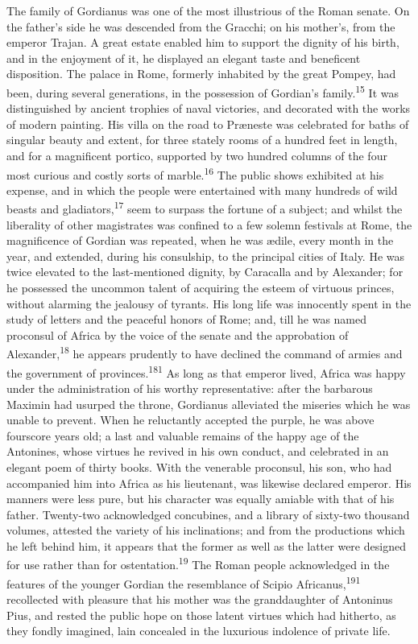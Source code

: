 The family of Gordianus was one of the most illustrious of the
Roman senate. On the father’s side he was descended from the
Gracchi; on his mother’s, from the emperor Trajan. A great estate
enabled him to support the dignity of his birth, and in the
enjoyment of it, he displayed an elegant taste and beneficent
disposition. The palace in Rome, formerly inhabited by the great
Pompey, had been, during several generations, in the possession
of Gordian’s family.\textsuperscript{15} It was distinguished by ancient trophies
of naval victories, and decorated with the works of modern
painting. His villa on the road to Præneste was celebrated for
baths of singular beauty and extent, for three stately rooms of a
hundred feet in length, and for a magnificent portico, supported
by two hundred columns of the four most curious and costly sorts
of marble.\textsuperscript{16} The public shows exhibited at his expense, and in
which the people were entertained with many hundreds of wild
beasts and gladiators,\textsuperscript{17} seem to surpass the fortune of a
subject; and whilst the liberality of other magistrates was
confined to a few solemn festivals at Rome, the magnificence of
Gordian was repeated, when he was ædile, every month in the year,
and extended, during his consulship, to the principal cities of
Italy. He was twice elevated to the last-mentioned dignity, by
Caracalla and by Alexander; for he possessed the uncommon talent
of acquiring the esteem of virtuous princes, without alarming the
jealousy of tyrants. His long life was innocently spent in the
study of letters and the peaceful honors of Rome; and, till he
was named proconsul of Africa by the voice of the senate and the
approbation of Alexander,\textsuperscript{18} he appears prudently to have
declined the command of armies and the government of provinces.\textsuperscript{181}
As long as that emperor lived, Africa was happy under the
administration of his worthy representative: after the barbarous
Maximin had usurped the throne, Gordianus alleviated the miseries
which he was unable to prevent. When he reluctantly accepted the
purple, he was above fourscore years old; a last and valuable
remains of the happy age of the Antonines, whose virtues he
revived in his own conduct, and celebrated in an elegant poem of
thirty books. With the venerable proconsul, his son, who had
accompanied him into Africa as his lieutenant, was likewise
declared emperor. His manners were less pure, but his character
was equally amiable with that of his father. Twenty-two
acknowledged concubines, and a library of sixty-two thousand
volumes, attested the variety of his inclinations; and from the
productions which he left behind him, it appears that the former
as well as the latter were designed for use rather than for
ostentation.\textsuperscript{19} The Roman people acknowledged in the features of
the younger Gordian the resemblance of Scipio Africanus,\textsuperscript{191}
recollected with pleasure that his mother was the granddaughter
of Antoninus Pius, and rested the public hope on those latent
virtues which had hitherto, as they fondly imagined, lain
concealed in the luxurious indolence of private life.

